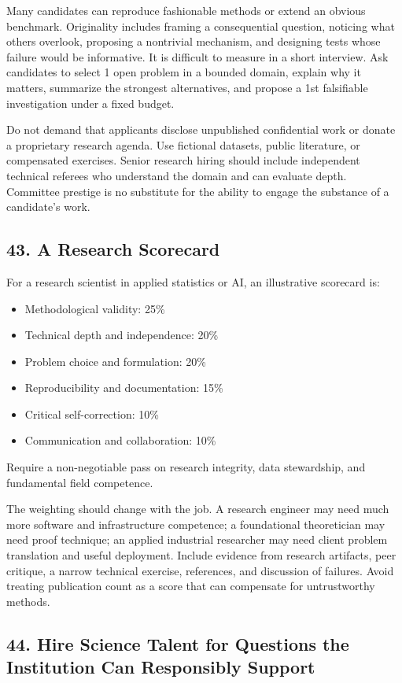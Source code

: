Many candidates can reproduce fashionable methods or extend an obvious benchmark. Originality includes framing a consequential question, noticing what others overlook, proposing a nontrivial mechanism, and designing tests whose failure would be informative. It is difficult to measure in a short interview. Ask candidates to select 1 open problem in a bounded domain, explain why it matters, summarize the strongest alternatives, and propose a 1st falsifiable investigation under a fixed budget.

Do not demand that applicants disclose unpublished confidential work or donate a proprietary research agenda. Use fictional datasets, public literature, or compensated exercises. Senior research hiring should include independent technical referees who understand the domain and can evaluate depth. Committee prestige is no substitute for the ability to engage the substance of a candidate's work.

\subsection*{43. A Research Scorecard}

For a research scientist in applied statistics or AI, an illustrative scorecard is:
\begin{itemize}[leftmargin=*]
\item Methodological validity: 25\%
\item Technical depth and independence: 20\%
\item Problem choice and formulation: 20\%
\item Reproducibility and documentation: 15\%
\item Critical self-correction: 10\%
\item Communication and collaboration: 10\%
\end{itemize}
Require a non-negotiable pass on research integrity, data stewardship, and fundamental field competence.

The weighting should change with the job. A research engineer may need much more software and infrastructure competence; a foundational theoretician may need proof technique; an applied industrial researcher may need client problem translation and useful deployment. Include evidence from research artifacts, peer critique, a narrow technical exercise, references, and discussion of failures. Avoid treating publication count as a score that can compensate for untrustworthy methods.

\subsection*{44. Hire Science Talent for Questions the Institution Can Responsibly Support}

